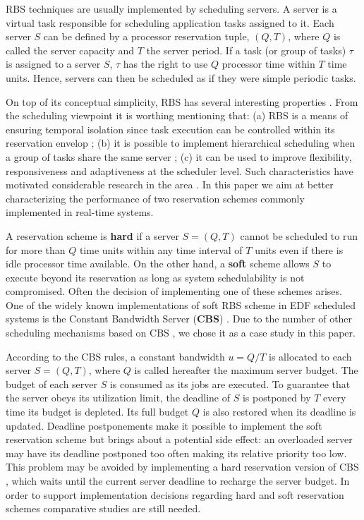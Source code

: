 \documentclass[times, 10pt,twocolumn]{article}
\begin{document}
RBS techniques are usually implemented by scheduling servers. A server
is a virtual task responsible for scheduling application tasks
assigned to it.  Each server $S$ can be defined by a processor
reservation tuple, $(Q,T)$, where $Q$ is called the server
capacity and $T$ the server period.  If a task (or group of tasks)
$\tau$ is assigned to a server $S$, $\tau$ has the right to use
$Q$ processor time within $T$ time units. Hence, servers can then
be scheduled as if they were simple periodic tasks.

On top of its conceptual simplicity, RBS has several interesting
properties \cite{steffens.ea03:resource}. From the scheduling
viewpoint it is worthing mentioning that: (a) RBS is a means of
ensuring temporal isolation since task execution can be controlled
within its reservation envelop
\cite{abeni.ea04:resource,mercer.ea94:processor,sprunt.ea89:aperiodic,spuri.ea96:scheduling};
(b) it is possible to implement hierarchical scheduling when a group
of tasks share the same server
\cite{davis.ea05:hierarchical,davis.ea08:investigation}; (c) it can be
used to improve flexibility, responsiveness and adaptiveness at the
scheduler level.  Such characteristics have motivated considerable
research in the area
\cite{abeni.ea99:adaptive,caccamo.ea00:capacity,caccamo.ea05:efficient,oliveira.ea08:dynamic,oliveira.ea09:dynamic,lin.ea05:improving}.
In this paper we aim at better characterizing the performance of two
reservation schemes commonly implemented in real-time systems.

A reservation scheme is \textbf{hard} if a server
$S = (Q,T)$ cannot be scheduled to run for more than $Q$ time
units within any time interval of $T$ units even if there is idle
processor time available. On the other hand, a \textbf{soft} scheme
allows $S$ to execute beyond its reservation as long as system
schedulability is not compromised. Often the decision of implementing
one of these schemes arises. One of the widely known implementations
of soft RBS scheme in EDF scheduled systems is the Constant Bandwidth
Server (\textbf{CBS}) \cite{abeni.ea04:resource}.  Due to the number
of other scheduling mechanisms based on CBS
\cite{abeni.ea05:qos,caccamo.ea00:capacity,caccamo.ea05:efficient,lipari.ea00:greedy},
we chose it as a case study in this paper.

According to the CBS rules, a constant bandwidth $u = Q/T$ is
allocated to each server $S = (Q,T)$, where $Q$ is called hereafter
the maximum server budget. The budget of each server $S$ is consumed
as its jobs are executed. To guarantee that the server obeys its
utilization limit, the deadline of $S$ is postponed by $T$ every time
its budget is depleted.  Its full budget $Q$ is also restored when its
deadline is updated.  Deadline postponements make it possible to
implement the soft reservation scheme but brings about a potential
side effect: an overloaded server may have its deadline postponed too
often making its relative priority too low.  This problem may be
avoided by implementing a hard reservation version of CBS
\cite{buttazzo05:soft}, which waits until the current server deadline
to recharge the server budget. In order to support implementation
decisions regarding hard and soft reservation schemes comparative
studies are still needed.
\end{document}
